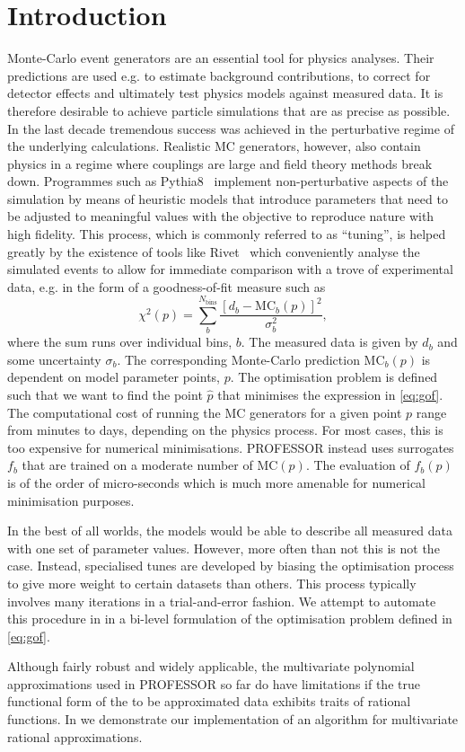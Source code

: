 %
\section{Introduction}
\label{intro}
Monte-Carlo event generators are an essential tool for physics analyses. Their
predictions are used e.g. to estimate background contributions, to correct for
detector effects and ultimately test physics models against measured data. It
is therefore desirable to achieve particle simulations that are as precise as
possible. In the last decade tremendous success was achieved in the
perturbative regime of the underlying calculations. Realistic MC generators,
however, also contain physics in a regime where couplings are large and field
theory methods break down.  Programmes such as Pythia8~\cite{Sjostrand:2007gs}
implement non-perturbative aspects of the simulation by means of heuristic
models that introduce parameters that need to be adjusted to meaningful values
with the objective to reproduce nature with high fidelity.  This process, which
is commonly referred to as ``tuning'', is helped greatly by the existence of
tools like Rivet~\cite{Buckley:2010ar} which conveniently analyse the simulated
events to allow for immediate comparison with a trove of experimental data,
e.g.  in the form of a goodness-of-fit measure such as
\begin{equation}\label{eq:gof}
    \chi^2(p) = \sum\limits_b^{N_\text{bins}} \frac{\left[d_b - \text{MC}_b(p)\right]^2}{\sigma_b^2},
\end{equation}
where the sum runs over individual bins, $b$. The measured data is given by
$d_b$ and some uncertainty $\sigma_b$. The corresponding Monte-Carlo
prediction $\text{MC}_b(p)$ is dependent on model parameter points, $p$.  The
optimisation problem is defined such that we want to find the point $\hat{p}$
that minimises the expression in \eqref{eq:gof}. The computational cost
of running the MC generators for a given point $p$ range from minutes
to days, depending on the physics process. For most cases, this is too
expensive for numerical minimisations. PROFESSOR instead uses surrogates $f_b$
that are trained on a moderate number of $\text{MC}(p)$. The evaluation of
$f_b(p)$ is of the order of micro-seconds which is much more amenable for
numerical minimisation purposes.

In the best of all worlds, the models would be able to describe all measured
data with one set of parameter values. However, more often than not this is
not the case. Instead, specialised tunes are developed by biasing the
optimisation process to give more weight to certain datasets than others. This
process typically involves many iterations in a trial-and-error fashion. We
attempt to automate this procedure in  in a bi-level
formulation of the optimisation problem defined in \eqref{eq:gof}.

Although fairly robust and widely applicable, the multivariate polynomial approximations
used in PROFESSOR so far do have limitations if the true functional form of the
to be approximated data exhibits traits of rational functions. In 
we demonstrate our implementation of an algorithm for multivariate rational
approximations.

